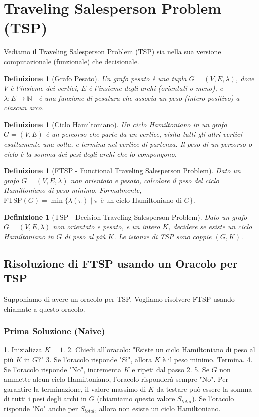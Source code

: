 \documentclass[a4paper, 11pt]{book} %
\newtheorem{definition}[theorem]{Definizione}
\theoremstyle{definition}
\begin{document}
\section{Traveling Salesperson Problem (TSP)}

Vediamo il Traveling Salesperson Problem (TSP) sia nella sua versione computazionale (funzionale) che decisionale.

\begin{definition}[Grafo Pesato]
Un grafo pesato è una tupla $G = (V, E, \lambda)$, dove $V$ è l'insieme dei vertici, $E$ è l'insieme degli archi (orientati o meno), e $\lambda: E \to \mathbb{N}^+$ è una funzione di pesatura che associa un peso (intero positivo) a ciascun arco.
\end{definition}

\begin{definition}[Ciclo Hamiltoniano]
Un ciclo Hamiltoniano in un grafo $G=(V, E)$ è un percorso che parte da un vertice, visita tutti gli altri vertici esattamente una volta, e termina nel vertice di partenza. Il peso di un percorso o ciclo è la somma dei pesi degli archi che lo compongono.
\end{definition}

\begin{definition}[FTSP - Functional Traveling Salesperson Problem]
Dato un grafo $G=(V, E, \lambda)$ non orientato e pesato, calcolare il peso del ciclo Hamiltoniano di peso minimo.
Formalmente, $\text{FTSP}(G) = \min \{ \lambda(\pi) \mid \pi \text{ è un ciclo Hamiltoniano di } G \}$.
\end{definition}

\begin{definition}[TSP - Decision Traveling Salesperson Problem]
Dato un grafo $G=(V, E, \lambda)$ non orientato e pesato, e un intero $K$, decidere se esiste un ciclo Hamiltoniano in $G$ di peso al più $K$.
Le istanze di TSP sono coppie $(G, K)$.
\end{definition}

\subsection{Risoluzione di FTSP usando un Oracolo per TSP}

Supponiamo di avere un oracolo per TSP. Vogliamo risolvere FTSP usando chiamate a questo oracolo.

\subsubsection{Prima Soluzione (Naive)}
1.  Inizializza $K=1$.
2.  Chiedi all'oracolo: "Esiste un ciclo Hamiltoniano di peso al più $K$ in $G$?"
3.  Se l'oracolo risponde "Sì", allora $K$ è il peso minimo. Termina.
4.  Se l'oracolo risponde "No", incrementa $K$ e ripeti dal passo 2.
5.  Se $G$ non ammette alcun ciclo Hamiltoniano, l'oracolo risponderà sempre "No". Per garantire la terminazione, il valore massimo di $K$ da testare può essere la somma di tutti i pesi degli archi in $G$ (chiamiamo questo valore $S_{total}$). Se l'oracolo risponde "No" anche per $S_{total}$, allora non esiste un ciclo Hamiltoniano.
\end{document}
